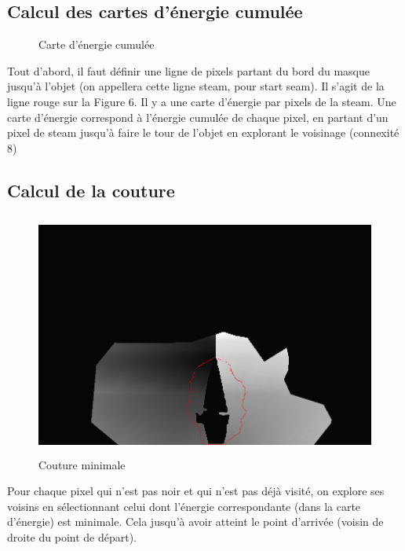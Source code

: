\documentclass[a4paper]{article}
\begin{document}
\subsection{Calcul des cartes d'énergie cumulée}
\begin{figure}[!ht]%
    \centering
    \hspace{0.030\textwidth}
    \caption{Carte d'énergie cumulée}
    \label{ecum}
\end{figure}

Tout d'abord, il faut définir une ligne de pixels partant du bord du masque jusqu'à l’objet (on appellera cette ligne steam, pour start seam). Il s'agit de la ligne rouge sur la Figure 6.
Il y a une carte d’énergie par pixels de la steam.
Une carte d’énergie correspond à l’énergie cumulée de chaque pixel, en partant d’un pixel de steam jusqu’à faire le tour de l’objet en explorant le voisinage (connexité 8)

\subsection{Calcul de la couture}

\begin{figure}[!h]
    	\centering \includegraphics[width=11.5cm, height=8cm]{img/min_seam.png}
    	\caption{Couture minimale}
        \label{meanseam}
\end{figure}
Pour chaque pixel qui n’est pas noir et qui n’est pas déjà visité, on explore ses voisins en sélectionnant celui dont l’énergie correspondante (dans la carte d’énergie) est minimale. Cela jusqu'à avoir atteint le point d'arrivée (voisin de droite du point de départ).
\end{document}
